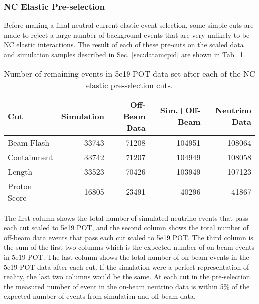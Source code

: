   \subsubsection{NC Elastic Pre-selection}
    Before making a final neutral current elastic event selection, some simple
    cuts are made to reject a large number of background events that are very
    unlikely to be NC elastic interactions. The result of each of these
    pre-cuts on the scaled data and simulation samples described in
    Sec.~\ref{sec:datamcpid} are shown in Tab.~\ref{tab:preseldatamc}. 
    \begin{table}
      \caption{Number of remaining events in 5e19 POT data set after each of
        the NC elastic pre-selection cuts.
      \label{tab:preseldatamc}}
      \begin{tabularx}{\textwidth}{l r r | r r}
        \hline
        Cut & Simulation & Off-Beam Data & Sim.+Off-Beam & Neutrino Data \\
        \hline
        Beam Flash & 33743 & 71208 & 104951 & 108064 \\
        Containment & 33742 & 71207 & 104949 & 108058 \\
        Length & 33523 & 70426 & 103949 & 107123 \\
        Proton Score & 16805 & 23491 & 40296 & 41867 \\
        \hline
      \end{tabularx}
    \end{table}
    The first column shows the total number of simulated neutrino events that
    pass each cut scaled to 5e19 POT, and the second column shows the total
    number of off-beam data events that pass each cut scaled to 5e19 POT. The
    third column is the sum of the first two columns which is the expected
    number of on-beam events in 5e19 POT. The last column shows the total
    number of on-beam events in the 5e19 POT data after each cut. If the
    simulation were a perfect representation of reality, the last two columns
    would be the same. At each cut in the pre-selection the measured number of
    event in the on-beam neutrino data is within 5\% of the expected number of
    events from simulation and off-beam data.

